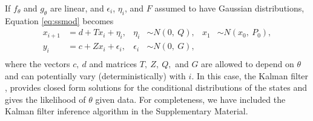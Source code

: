 \documentclass[aoas]{imsart}
\DeclareRobustCommand{\varx}{{\mathpalette\irchi\relax}}
\newcommand{\irchi}[2]{\protect\raisebox{\depth}{$#1\upchi$}}
\begin{document}
If $f_\theta$ and $g_\theta$ are linear, and $\epsilon_i$,
$\eta_i$, and $F$ assumed to have Gaussian distributions, Equation \eqref{eq:ssmod} becomes
\begin{equation}
  \begin{aligned}
    x_{i+1}&= d+T x_i + \eta_{i}, 
    & \eta_i &\sim N(0,\ Q),     
    &x_1 &\sim N(x_0,\ P_0),\\
    y_i&= c + Z x_i + \epsilon_i,     
    & \epsilon_i &\sim N(0,\ G), \\
  \end{aligned}
  \label{eq:lgmod}
\end{equation}
where the vectors $c,\ d$ and matrices $T,\ Z,\ Q,$ and $G$ are allowed to depend
on $\theta$ and can potentially vary (deterministically) with $i$. In this case,
the Kalman filter %
\citep[see for example,][]{Kalman1960,Harvey1990},
provides closed form 
solutions for the conditional
distributions of the states and gives the likelihood of $\theta$
given data. For completeness, we have included the Kalman filter
inference algorithm in
the Supplementary Material.%
\end{document}
